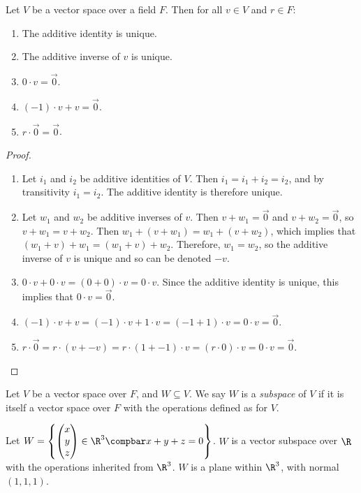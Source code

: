 \documentclass[12pt]{article}
\begin{document}
\begin{lemma}\label{vector-space-properties}
    Let $V$ be a vector space over a field $F$. Then for all $v \in V$ and $r \in F$: \begin{enumerate}
        \item The additive identity is unique.
        \item The additive inverse of $v$ is unique.
        \item $0 \cdot v = \vec{0}$.
        \item $(-1) \cdot v + v = \vec{0}$.
        \item $r \cdot \vec{0} = \vec{0}$.
    \end{enumerate}
\end{lemma}

\begin{proof}\proofbreak
    \begin{enumerate}
        \item Let $i_1$ and $i_2$ be additive identities of $V$. Then $i_1 = i_1 + i_2 = i_2$, and by transitivity $i_1 = i_2$. The additive identity is therefore unique.
        \item Let $w_1$ and $w_2$ be additive inverses of $v$. Then $v + w_1 = \vec{0}$ and $v + w_2 = \vec{0}$, so $v + w_1 = v + w_2$. Then $w_1 + (v + w_1) = w_1 + (v + w_2)$, which implies that $(w_1 + v) + w_1 = (w_1 + v) + w_2$. Therefore, $w_1 = w_2$, so the additive inverse of $v$ is unique and so can be denoted $-v$.
        \item $0 \cdot v + 0 \cdot v = (0 + 0) \cdot v = 0 \cdot v$. Since the additive identity is unique, this implies that $0 \cdot v = \vec{0}$.
        \item $(-1) \cdot v + v = (-1) \cdot v + 1 \cdot v = (-1 + 1) \cdot v = 0 \cdot v = \vec{0}$.
        \item $r \cdot \vec{0} = r \cdot (v + -v) = r \cdot (1 + -1) \cdot v = (r \cdot 0)\cdot v = 0 \cdot v = \vec{0}$.
    \end{enumerate}
\end{proof}

\begin{defn}\label{subspace-defn}
    Let $V$ be a vector space over $F$, and $W \subseteq V$. We say $W$ is a \emph{subspace} of $V$ if it is itself a vector space over $F$ with the operations defined as for $V$.
\end{defn}

\begin{exmp}
    Let $W = \left\{\begin{pmatrix}
            x \\ y \\ z
        \end{pmatrix} \in \R^3 \compbar x + y + z = 0\right\}$. $W$ is a vector subspace over $\R$ with the operations inherited from $\R^3$. $W$ is a plane within $\R^3$, with normal $(1, 1, 1)$.
\end{exmp}
\end{document}
